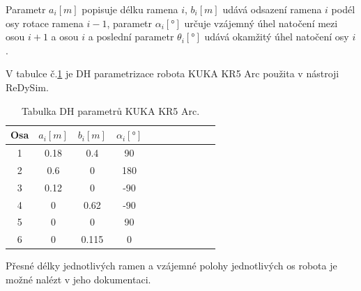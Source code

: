 Parametr $a_i [m]$ popisuje délku ramena $i$, $b_i [m]$ udává odsazení ramena $i$ podél osy rotace ramena $i-1$, parametr $\alpha_i [\si{\degree}]$ určuje vzájemný úhel natočení mezi osou $i+1$ a osou $i$ a poslední parametr $\theta_i [\si{\degree}]$ udává okamžitý úhel natočení osy $i$.

V tabulce č.\ref{tab_DH_kuka} je DH parametrizace robota KUKA KR5 Arc použita v nástroji ReDySim.

\begin{table}[htbp]
  \centering
  \caption{Tabulka DH parametrů KUKA KR5 Arc.}
    \begin{tabular}{c|cccccccccc}
    \multicolumn{1}{c|}{Osa} & \multicolumn{1}{c}{$a_{i} [m]$} & \multicolumn{1}{c}{$b_{i} [m]$} & \multicolumn{1}{c}{$\alpha_{i} [\si{\degree}]$} \\
    \hline
    1     &   0.18  &  0.4   &  90     &     \\
    2     &   0.6   &  0     &  180    &     \\
    3     &   0.12  &  0     &  -90    &     \\
    4     &   0     &  0.62  &  -90    &     \\
    5     &   0     &  0     &  90     &     \\
    6     &   0     &  0.115 &  0      &     \\
    \end{tabular}%
  \label{tab_DH_kuka}%
\end{table}%

Přesné délky jednotlivých ramen a vzájemné polohy jednotlivých os robota je možné nalézt v jeho dokumentaci.

